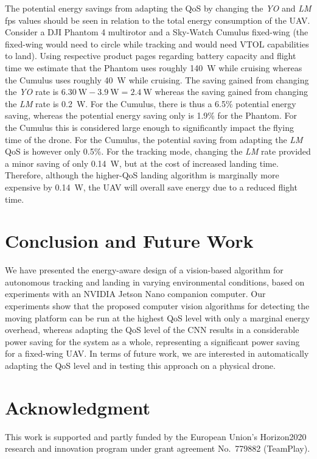 \documentclass[conference]{IEEEtran}
\begin{document}
The potential energy savings from
adapting the QoS by changing the \emph{YO} and \emph{LM} fps values
should be seen
in relation to the total energy consumption of the UAV. 
Consider a DJI Phantom 4 multirotor and a Sky-Watch Cumulus
fixed-wing (the fixed-wing would need to circle while tracking and 
would need VTOL capabilities to land). Using respective
  product pages regarding battery capacity and flight time we estimate
that the Phantom uses roughly \SI{140}{\watt} while cruising whereas the Cumulus
uses roughly \SI{40}{\watt} while cruising. The saving gained from
changing the \emph{YO}
rate is 
$\SI{6.30}{\watt}-\SI{3.9}{\watt}=\SI{2.4}{\watt}$ whereas the
saving gained from changing the \emph{LM}
rate is
\SI{0.2}{\watt}. For the Cumulus, there is thus a 6.5\% potential energy
saving, whereas the potential energy saving only is 1.9\% for the
Phantom. For the Cumulus this is considered large enough to
significantly impact the flying time of the drone. %
For the Cumulus, the potential saving from adapting
the \emph{LM}
QoS is however only 0.5\%. 
%
For the tracking mode, changing the \emph{LM}
rate
provided a minor saving of only \SI{0.14}{\watt}, but at the cost of increased
landing time. Therefore, although the higher-QoS landing %
algorithm is marginally more expensive by \SI{0.14}{\watt}, the UAV will
overall save energy due to a reduced flight time.

\section{Conclusion and Future Work}
\label{sec:conclusion}

We have presented %
the energy-aware design of a vision-based
algorithm for autonomous tracking and landing in varying environmental
conditions, based on experiments %
with an NVIDIA Jetson Nano companion computer.
%
Our experiments show that the proposed computer vision algorithms for 
detecting the moving platform can be run at the highest QoS level with only a marginal
energy overhead, whereas adapting the QoS level of the CNN %
results in a considerable power saving for the system as a whole, 
representing a significant power saving for a fixed-wing UAV. %
%
In terms of future work, we are interested in automatically adapting
the QoS level %
and in testing this approach
on a physical drone.

\section*{Acknowledgment}

This work is supported and partly funded by the European Union’s
Horizon2020 research and innovation program under grant agreement
No.~779882 (TeamPlay).


 
\vspace{1ex}
\end{document}
